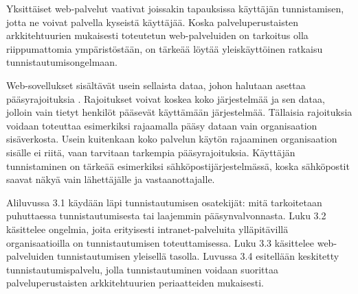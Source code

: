 Yksittäiset web-palvelut vaativat joissakin tapauksissa käyttäjän tunnistamisen, jotta ne voivat palvella kyseistä käyttäjää. Koska palveluperustaisten arkkitehtuurien mukaisesti toteutetun web-palveluiden on tarkoitus olla riippumattomia ympäristöstään, on tärkeää löytää yleiskäyttöinen ratkaisu tunnistautumisongelmaan.

Web-sovellukset sisältävät usein sellaista dataa, johon halutaan asettaa pääsyrajoituksia \cite{inside_the_identity_management_game}. Rajoitukset voivat koskea koko järjestelmää ja sen dataa, jolloin vain tietyt henkilöt pääsevät käyttämään järjestelmää. Tällaisia rajoituksia voidaan toteuttaa esimerkiksi rajaamalla pääsy dataan vain organisaation sisäverkosta. Usein kuitenkaan koko palvelun käytön rajaaminen organisaation sisälle ei riitä, vaan tarvitaan tarkempia pääsyrajoituksia. Käyttäjän tunnistaminen on tärkeää esimerkiksi sähköpostijärjestelmässä, koska sähköpostit saavat näkyä vain lähettäjälle ja vas\-taan\-ot\-ta\-jal\-le.

Aliluvussa 3.1 käydään läpi tunnistautumisen osatekijät: mitä tarkoitetaan puhuttaessa tunnistautumisesta tai laajemmin pääsynvalvonnasta. Luku 3.2 käsittelee ongelmia, joita erityisesti intranet-palveluita ylläpitävillä organisaatioilla on tunnistautumisen toteuttamisessa. Luku 3.3 käsittelee web-palveluiden tunnistautumisen yleisellä tasolla. Luvussa 3.4 esitellään keskitetty tunnistautumispalvelu, jolla tunnistautuminen voidaan suorittaa palveluperustaisten arkkitehtuurien periaatteiden mukaisesti.